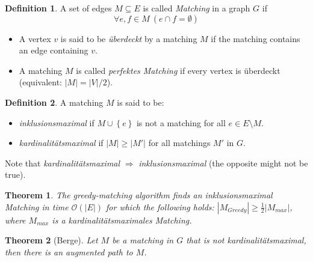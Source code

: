 \documentclass[12pt]{extarticle}
\theoremstyle{definition}
\newtheorem{definition}{Definition}
\theoremstyle{remark}
\theoremstyle{plain}
\newtheorem{theorem}{Theorem}
\newcommand{\BO}{\mathcal{O}}
\begin{document}
\begin{definition}
    A set of edges $M \subseteq E$ is called \textit{Matching} in a graph $G$ if
    \[ \forall e,f \in M\ (e \cap f = \emptyset) \]

    \begin{itemize}
        \item A vertex $v$ is said to be \textit{überdeckt} by a matching $M$ if the matching contains an edge containing $v$.
        \item A matching $M$ is called \textit{perfektes Matching} if every vertex is überdeckt (equivalent: $|M| = |V| / 2$).
    \end{itemize}
\end{definition}

\begin{definition}
    A matching $M$ is said to be:
    \begin{itemize}
        \item \textit{inklusionsmaximal} if $M \cup \left\{ e \right\}$ is not a matching for all $e \in E \setminus M$.
        \item \textit{kardinalitätsmaximal} if $|M| \ge |M'|$ for all matchings $M'$ in $G$.
    \end{itemize}
 
    Note that \textit{kardinalitätsmaximal} $\Rightarrow$ \textit{inklusionsmaximal} (the opposite might not be true).
\end{definition}

\begin{theorem}
    The greedy-matching algorithm finds an inklusionsmaximal Matching in time $\BO(|E|)$
    for which the following holds: $|M_{Greedy}| \ge \frac{1}{2} |M_{max}|$, where $M_{max}$ is a kardinalitätsmaximales Matching.
\end{theorem}

\begin{theorem}[Berge]
    Let $M$ be a matching in $G$ that is not kardinalitätsmaximal, then there is an augmented path to $M$.
\end{theorem}
\end{document}
